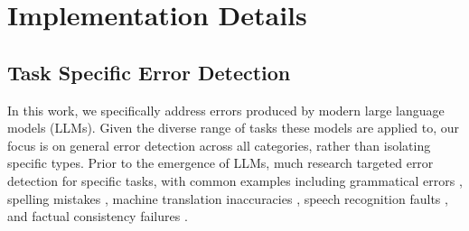 \documentclass{article} %
\begin{document}



\clearpage 

\appendix


\section{Implementation Details}
\label{app:implementation}

\subsection{Task Specific Error Detection}
\label{app:detection_lit}
In this work, we specifically address errors produced by modern large language models (LLMs). Given the diverse range of tasks these models are applied to, our focus is on general error detection across all categories, rather than isolating specific types. Prior to the emergence of LLMs, much research targeted error detection for specific tasks, with common examples including grammatical errors \citep{DBLP:conf/emnlp/KasewaS018,DBLP:conf/bea/BellYR19,cheng-duan-2020-chinese,DBLP:conf/ijcnn/Wang020,DBLP:conf/bea/FlickingerGP16}, spelling mistakes \citep{mishra2013survey}, machine translation inaccuracies \citep{lo-2019-yisi,pu-etal-2021-learning,sellam-etal-2020-bleurt,gekhman-etal-2020-kobe,rei-etal-2020-comet,rei-etal-2022-comet,rei-etal-2022-cometkiwi}, speech recognition faults \citep{DBLP:conf/coling/CainesBKRB20,rao-etal-2020-overview,DBLP:conf/acl/0101W24,DBLP:journals/taslp/ZhouSFS05,DBLP:conf/interspeech/Allauzen07,gekhman-etal-2022-red,DBLP:conf/icnlsp/ErrattahiHO15,DBLP:conf/ltconf/PellegriniT09,DBLP:conf/icassp/ChenAKPN13}, and factual consistency failures \citep{honovich-etal-2022-true-evaluating,laban-etal-2022-summac,honovich-etal-2021-q2,gekhman-etal-2023-trueteacher,scialom-etal-2021-questeval,kryscinski-etal-2020-evaluating}.

\end{document}
